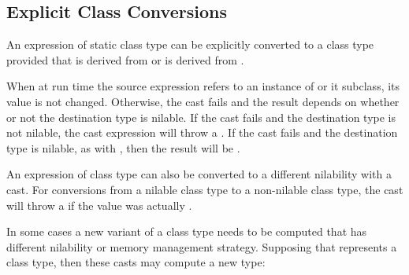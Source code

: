 \subsection{Explicit Class Conversions}
\label{Explicit_Class_Conversions}

An expression of static class type  can be explicitly
converted to a class type  provided that  is derived
from  or  is derived from .

When at run time the source expression refers to an instance of 
or it subclass, its value is not changed.  Otherwise, the cast fails and
the result depends on whether or not the destination type is nilable. If
the cast fails and the destination type is not nilable, the cast
expression will throw a . If the cast fails and the
destination type is nilable, as with , then the result will be
.

An expression of class type can also be converted to a different
nilability with a cast. For conversions from a nilable class type to a
non-nilable class type, the cast will throw a  if the
value was actually .

In some cases a new variant of a class type needs to be computed that has
different nilability or memory management strategy. Supposing that
 represents a class type, then these casts may compute a new type:


